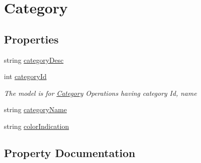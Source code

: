 \hypertarget{classWildLifeTracker_1_1Models_1_1Category}{}\section{Category}
\label{classWildLifeTracker_1_1Models_1_1Category}
\subsection*{Properties}
\begin{DoxyCompactItemize}
\item 
string \hyperlink{classWildLifeTracker_1_1Models_1_1Category_ae992743f1fc0d9386b609d8871a4bd6b}{category\+Desc}
\item 
int \hyperlink{classWildLifeTracker_1_1Models_1_1Category_a423f91c56dc35040d661cfbe357f7c78}{category\+Id}
\begin{DoxyCompactList}\small\item\em The model is for \hyperlink{classWildLifeTracker_1_1Models_1_1Category}{Category} Operations having category Id, name \end{DoxyCompactList}\item 
string \hyperlink{classWildLifeTracker_1_1Models_1_1Category_a1eca787c85e1bc45b49bbd281d4106fd}{category\+Name}
\item 
string \hyperlink{classWildLifeTracker_1_1Models_1_1Category_a0ecdefcc99a4b41b1ef3a04167756366}{color\+Indication}
\end{DoxyCompactItemize}


\subsection{Property Documentation}
\mbox{\label{classWildLifeTracker_1_1Models_1_1Category_ae992743f1fc0d9386b609d8871a4bd6b}} 
